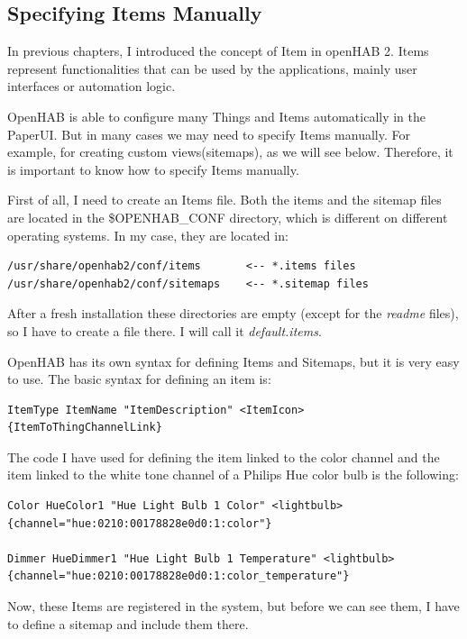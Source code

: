 \subsection{Specifying Items Manually}
In previous chapters, I introduced the concept of Item in openHAB 2. Items represent functionalities that can be used by the 
applications, mainly user interfaces or automation logic.

OpenHAB is able to configure many Things and Items automatically in the PaperUI. But in many cases we may need to specify Items
manually. For example, for creating custom views(sitemaps), as we will see below. Therefore, it is important to know how to specify
Items manually.

First of all, I need to create an Items file. Both the items and the sitemap files are located in the \$OPENHAB\_CONF directory, 
which is different on different operating systems. In my case, they are located in:

\begin{lstlisting}[style=Consola]
/usr/share/openhab2/conf/items       <-- *.items files
/usr/share/openhab2/conf/sitemaps    <-- *.sitemap files
\end{lstlisting}

After a fresh installation these directories are empty (except for the \textit{readme} files), so I have to create a file there.
I will call it \textit{default.items}.

OpenHAB has its own syntax for defining Items and Sitemaps, but it is very easy to use. The basic syntax for defining an item is:

\begin{lstlisting}[style=Consola]
ItemType ItemName "ItemDescription" <ItemIcon> {ItemToThingChannelLink}
\end{lstlisting}

The code I have used for defining the item linked to the color channel and the item linked to the white tone channel of a Philips 
Hue color bulb is the following:

\begin{lstlisting}[style=Consola]
Color HueColor1 "Hue Light Bulb 1 Color" <lightbulb> {channel="hue:0210:00178828e0d0:1:color"}

Dimmer HueDimmer1 "Hue Light Bulb 1 Temperature" <lightbulb> {channel="hue:0210:00178828e0d0:1:color_temperature"}
\end{lstlisting}

Now, these Items are registered in the system, but before we can see them, I have to define a sitemap and include them there.

